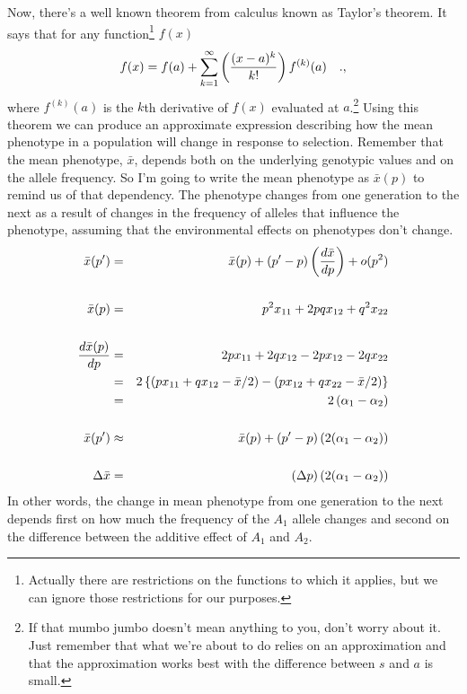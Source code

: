 \documentclass[12pt]{article}
\begin{document}
Now, there's a well known theorem from calculus known as Taylor's
theorem. It says that for any function\footnote{Actually there are
  restrictions on the functions to which it applies, but we can ignore
  those restrictions for our purposes.} $f(x)$
\[
f(x) = f(a) + \sum_{k=1}^\infty \left({{(x-a)^k} \over k!}\right)
                                 f^{(k)}(a) \quad .,
\]
where $f^{(k)}(a)$ is the $k$th derivative of $f(x)$ evaluated at
$a$.\footnote{If that mumbo jumbo doesn't mean anything to you, don't
  worry about it. Just remember that what we're about to do relies on
  an approximation and that the approximation works best with the
  difference between $s$ and $a$ is small.}  Using this theorem we can
produce an approximate expression describing how the mean phenotype in
a population will change in response to selection. Remember that the
mean phenotype, $\bar x$, depends both on the underlying genotypic
values and on the allele frequency. So I'm going to write the mean
phenotype as $\bar x(p)$ to remind us of that dependency. The
phenotype changes from one generation to the next as a result of
changes in the frequency of alleles that influence the phenotype,
assuming that the environmental effects on phenotypes don't change.
\begin{eqnarray*}
{\bar x}(p') &=& {\bar x}(p) + (p' - p)\left({d{\bar x} \over dp}\right)
             + o(p^2) \\
\\
{\bar x}(p) &=& p^2x_{11} + 2pqx_{12} + q^2x_{22} \\
\\
\frac{d{\bar x(p)}}{dp}
         &=& 2px_{11} + 2qx_{12} - 2px_{12} - 2qx_{22} \\
         &=& 2\left\{
             \left(px_{11} + qx_{12} - {\bar x}/2\right) -
             \left(px_{12} + qx_{22} - {\bar x}/2\right)\right\} \\
         &=& 2\left(\alpha_1 - \alpha_2\right) \\
\\
{\bar x}(p') &\approx& {\bar x}(p) + (p' - p)\left(2(\alpha_1 - \alpha_2)\right) \\
\\
\Delta{\bar x} &=& (\Delta p)\left(2(\alpha_1 - \alpha_2)\right)
\end{eqnarray*}
In other words, the change in mean phenotype from one generation to
the next depends first on how much the frequency of the $A_1$ allele
changes and second on the difference between the additive effect of
$A_1$ and $A_2$.
\end{document}
